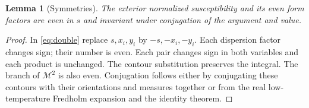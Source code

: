 \documentclass[11pt]{article}
\numberwithin{equation}{section}
\newtheorem{lemma}[theorem]{Lemma}
\theoremstyle{definition}
\newcommand{\M}{\mathcal M}
\begin{document}
\begin{lemma}[Symmetries]\label{lem:symmetry}
The exterior normalized susceptibility and its even form factors are even
in \(s\) and invariant under conjugation of the argument and value.
\end{lemma}
\begin{proof}
In \eqref{eq:double} replace \(s,x_i,y_i\) by \(-s,-x_i,-y_i\).
Each dispersion factor changes sign; their number is even. Each pair
changes sign in both variables and each product is unchanged.
The contour substitution preserves the integral. The branch of \(\M^2\)
is also even. Conjugation follows either by conjugating these contours
with their orientations and measures together or from the real
low-temperature Fredholm expansion and the identity theorem.
\end{proof}



\end{document}
